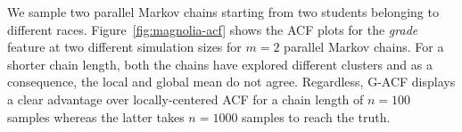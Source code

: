 \documentclass[11pt]{article}
\theoremstyle{remark}
\begin{document}







We sample two parallel Markov chains starting from two students belonging to different races.
% 
Figure~\ref{fig:magnolia-acf} shows the ACF plots for the \textit{grade} feature at two different simulation sizes for $m=2$ parallel Markov chains. For a shorter chain length, both the chains have explored different clusters and as a consequence, the local and global mean do not agree. Regardless, G-ACF displays a clear advantage over locally-centered ACF for a chain length of $n=100$ samples whereas the latter takes $n=1000$ samples to reach the truth. 



\singlespacing


\end{document}
